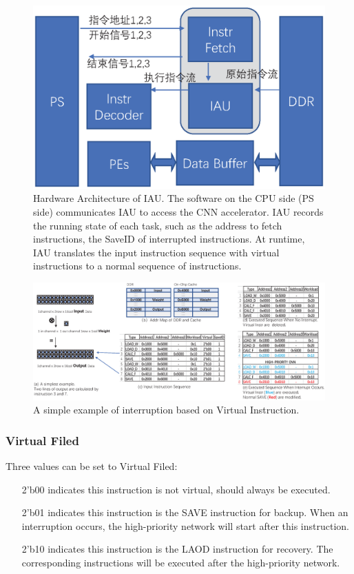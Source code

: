 \begin{figure}[t]
	\centering
	\includegraphics[width=0.99\linewidth]{fig/IAU.eps}
	\caption{Hardware Architecture of IAU. The software on the CPU side (PS side) communicates IAU to access the CNN accelerator. IAU records the running state of each task, such as the address to fetch instructions, the SaveID of interrupted instructions. At runtime, IAU translates the input instruction sequence with virtual instructions to a normal sequence of instructions. }
	\label{fig:IAU}
\end{figure}

\begin{figure}[t]
	\centering
	\includegraphics[width=0.95\linewidth]{fig/interexample.eps}
	\caption{ A simple example of interruption based on Virtual Instruction. }
	\label{fig:interexample}
\end{figure}

\subsubsection{ Virtual Filed}

Three values can be set to Virtual Filed:
\begin{itemize}
    \item[2'b00] indicates this instruction is not virtual, should always be executed.
    \item[2'b01] indicates this instruction is the SAVE instruction for backup. When an interruption occurs, the high-priority network will start after this instruction.
    \item[2'b10] indicates this instruction is the LAOD instruction for recovery. The corresponding instructions will be executed after the high-priority network.
\end{itemize}

